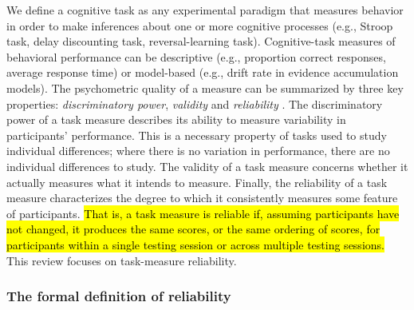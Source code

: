 \documentclass[a4paper,12pt]{article}
\begin{document}
We define a cognitive task as any experimental paradigm that measures behavior in order to make inferences about one or more cognitive processes (e.g., Stroop task, delay discounting task, reversal-learning task). Cognitive-task measures of behavioral performance can be descriptive (e.g., proportion correct responses, average response time) or model-based (e.g., drift rate in evidence accumulation models). The psychometric quality of a measure can be summarized by three key properties: \emph{discriminatory power}, \emph{validity} and \emph{reliability} \cite{kline2015handbook}. The discriminatory power of a task measure describes its ability to measure variability in participants' performance. This is a necessary property of tasks used to study individual differences; where there is no variation in performance, there are no individual differences to study. The validity of a task measure concerns whether it actually measures what it intends to measure. Finally, the reliability of a task measure characterizes the degree to which it consistently measures some feature of participants. \hl{That is, a task measure is reliable if, assuming participants have not changed, it produces the same scores, or the same ordering of scores, for participants within a single testing session or across multiple testing sessions.} This review focuses on task-measure reliability. 

\subsubsection*{The formal definition of reliability}
\end{document}
